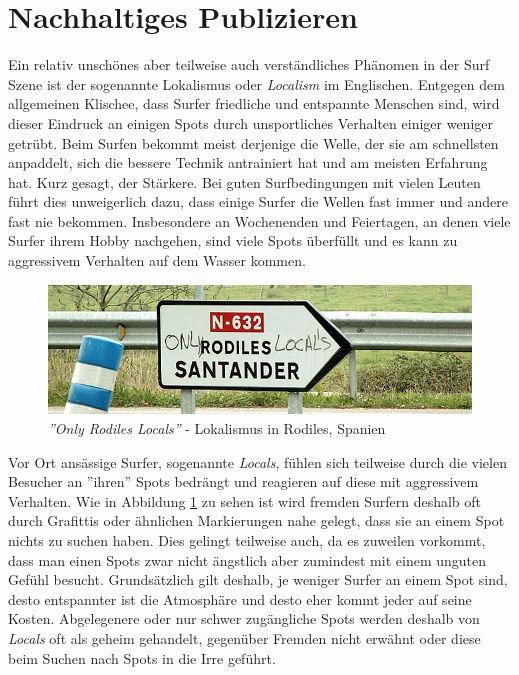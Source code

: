 \section{Nachhaltiges Publizieren}
Ein relativ unschönes aber teilweise auch verständliches Phänomen in
der Surf Szene ist der sogenannte Lokalismus oder \textit{Localism} im
Englischen. Entgegen dem allgemeinen Klischee, dass Surfer friedliche
und entspannte Menschen sind, wird dieser Eindruck an einigen Spots
durch unsportliches Verhalten einiger weniger getrübt. Beim Surfen
bekommt meist derjenige die Welle, der sie am schnellsten anpaddelt,
sich die bessere Technik antrainiert hat und am meisten Erfahrung
hat. Kurz gesagt, der Stärkere. Bei guten Surfbedingungen mit vielen
Leuten führt dies unweigerlich dazu, dass einige Surfer die Wellen
fast immer und andere fast nie bekommen. Insbesondere an Wochenenden
und Feiertagen, an denen viele Surfer ihrem Hobby nachgehen, sind
viele Spots überfüllt und es kann zu aggressivem Verhalten auf dem
Wasser kommen.

\begin{figure}[h]
  \includegraphics[width=\textwidth]{bilder/locals-only}
  \caption{\textit{''Only Rodiles Locals''} - Lokalismus in Rodiles,
    Spanien}
  \label{locals-only}
\end{figure}

Vor Ort ansässige Surfer, sogenannte \textit{Locals}, fühlen sich
teilweise durch die vielen Besucher an ''ihren'' Spots bedrängt und
reagieren auf diese mit aggressivem Verhalten. Wie in Abbildung
\ref{locals-only} zu sehen ist wird fremden Surfern deshalb oft durch
Grafittis oder ähnlichen Markierungen nahe gelegt, dass sie an einem
Spot nichts zu suchen haben. Dies gelingt teilweise auch, da es
zuweilen vorkommt, dass man einen Spots zwar nicht ängstlich aber
zumindest mit einem unguten Gefühl besucht. Grundsätzlich gilt
deshalb, je weniger Surfer an einem Spot sind, desto entspannter ist
die Atmosphäre und desto eher kommt jeder auf seine
Kosten. Abgelegenere oder nur schwer zugängliche Spots werden deshalb
von \textit{Locals} oft als geheim gehandelt, gegenüber Fremden nicht
erwähnt oder diese beim Suchen nach Spots in die Irre geführt.

